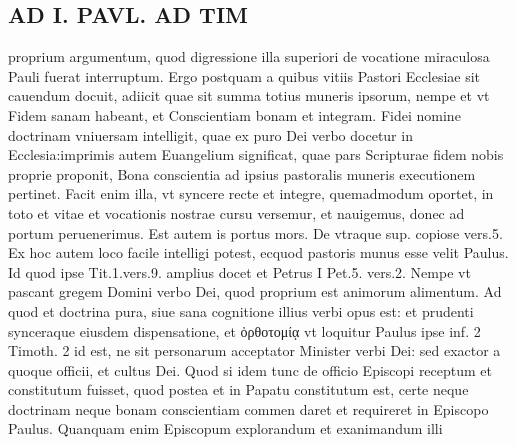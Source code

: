 \documentclass{article}
\begin{document}
\begin{pages}
\section*{AD I. PAVL. AD TIM }
\marginpar{[ p.34 ]}\pstart proprium argumentum, quod digressione illa superiori de vocatione miraculosa Pauli fuerat interruptum. Ergo postquam a quibus vitiis Pastori Ecclesiae sit cauendum docuit, adiicit quae sit summa totius muneris ipsorum, nempe et vt Fidem sanam habeant, et Conscientiam bonam et integram. Fidei nomine doctrinam vniuersam intelligit, quae ex puro Dei verbo docetur in Ecclesia:imprimis autem Euangelium significat, quae pars Scripturae fidem nobis proprie proponit, Bona conscientia ad ipsius pastoralis muneris executionem pertinet. Facit enim illa, vt syncere recte et integre, quemadmodum oportet, in toto et vitae et vocationis nostrae cursu versemur, et nauigemus, donec ad portum peruenerimus. Est autem is portus mors. De vtraque sup. copiose vers.5.  \pend\pstart Ex hoc autem loco facile intelligi potest, ecquod pastoris munus esse velit Paulus. Id quod ipse Tit.1.vers.9. amplius docet et Petrus I Pet.5. vers.2. Nempe vt pascant gregem Domini verbo Dei, quod proprium est animorum alimentum. Ad quod et doctrina pura, siue sana cognitione illius verbi opus est: et prudenti synceraque eiusdem dispensatione, et ὀρθοτομίᾳ vt loquitur Paulus ipse inf. 2 Timoth. 2 id est, ne sit personarum acceptator Minister verbi Dei: sed exactor a quoque officii, et cultus Dei. Quod si idem tunc de officio Episcopi receptum et constitutum fuisset, quod postea et in Papatu constitutum est, certe neque  doctrinam neque bonam conscientiam commen daret et requireret in Episcopo Paulus. Quanquam enim Episcopum explorandum et exanimandum illi  \pend

\end{pages}
\end{document}
